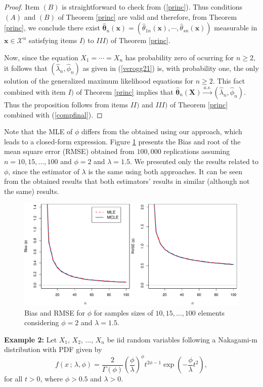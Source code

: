 \documentclass[10pt,a4paper,onecolumn]{article} %
\newcommand{\bs}{\boldsymbol}
\begin{document}
\begin{proof}
Item $(B)$ is straightforward to check from (\ref{princ}). Thus conditions $(A)$ and $(B)$ of Theorem \ref{princ} are valid and therefore, from Theorem \ref{princ}, we conclude there exist $\bs{\hat{\theta}}_n(\bs{x})=(\hat{\theta}_{1n}(\bs{x}),\cdots,\hat{\theta}_{sn}(\bs{x}))$ measurable in $\bs{x}\in \mathcal{X}^n$ satisfying items $I)$ to $III)$ of Theorem \ref{princ}.

 Now, since the equation $X_1=\cdots=X_n$ has probability zero of ocurring for $n\geq 2$, it follows that $(\hat\lambda_n,\hat\phi_n)$ as given in (\ref{verogg21}) is, with probability one, the only solution of the generalized maximum likelihood equations for $n\geq 2$.
This fact combined with item $I)$ of Theorem \ref{princ} implies that $\bs{\hat{\theta}}_n(\bs{X})\overset{a.s.}{\to} (\hat\lambda_n,\hat\phi_n)$. Thus the proposition follows from items $II)$ and $III)$ of Theorem \ref{princ}  combined with (\ref{compfinal}).
\end{proof}

Note that the MLE of $\phi$ differs from the obtained using our approach, which leads to a closed-form expression. Figure \ref{fg1} presents the Bias and root of the mean square error (RMSE) obtained from $100,000$ replications assuming $n=10,15,\ldots,100$ and $\phi=2$ and $\lambda=1.5$. We presented only the results related to $\phi$, since the estimator of $\lambda$ is the same using both approaches. It can be seen from the obtained results that both estimators' results in similar (although not the same) results.
\begin{figure}[!ht]
\centering
\includegraphics[scale=0.6]{biasgamma.pdf}	
\caption{Bias and RMSE for $\phi$ for samples sizes of $10,15,\ldots,100$ elements considering $\phi=2$ and $\lambda=1.5$.}\label{fg1}
\end{figure}

\noindent\textbf{Example 2:} Let $X_1$, $X_2$, $\ldots$, $X_n$ be iid random variables following a Nakagami-m distribution with PDF given by
\begin{equation*}\label{fdpnk}
f(x\,;\,\lambda,\phi)=\frac{2}{\Gamma(\phi)}\left(\frac{\phi}{\lambda} \right)^\phi t^{2\phi-1}\exp\left(-\frac{\phi}{\lambda} t^2 \right), 
\end{equation*}
for all $t>0$, where $\phi> 0.5$ and $\lambda>0$.
\end{document}
